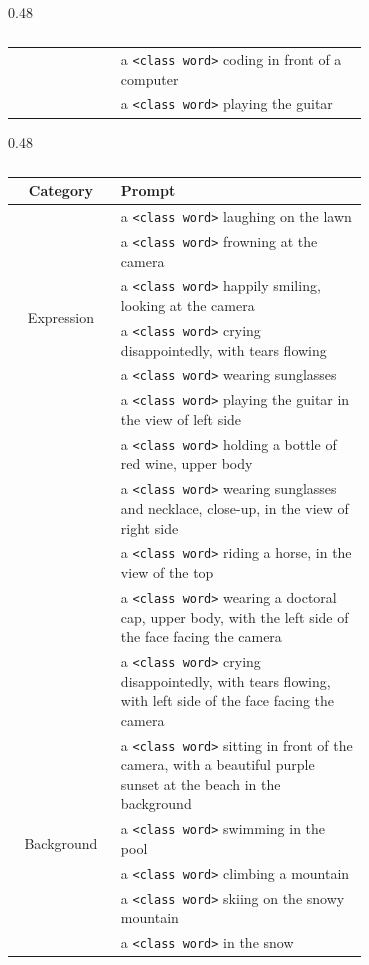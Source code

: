 \begin{table}
\begin{subtable}[h]{0.48\linewidth}
\begin{tabular}{c|p{0.7\linewidth}}
         &  a \texttt{<class word>} coding in front of a computer\\
         &  a \texttt{<class word>} playing the guitar\\
    \bottomrule
    \end{tabular}
    \caption{}
    \end{subtable}
    \begin{subtable}[h]{0.48\linewidth}
    \centering
        \begin{tabular}{c|p{0.7\linewidth}}
        \toprule
            Category  & Prompt \\
        \midrule
         \multirow{6}{*}{Expression}& a \texttt{<class word>} laughing on the lawn\\
         &  a \texttt{<class word>} frowning at the camera\\
         &  a \texttt{<class word>} happily smiling, looking at the camera\\
         &  a \texttt{<class word>} crying disappointedly, with tears flowing\\
         &  a \texttt{<class word>} wearing sunglasses\\
         \hline
          \multirow{14}{*}{View}& a \texttt{<class word>} playing the guitar in the view of left side\\
         &  a \texttt{<class word>} holding a bottle of red wine, upper body\\
         &  a \texttt{<class word>} wearing sunglasses and necklace, close-up, in the view of right side\\
         &  a \texttt{<class word>} riding a horse, in the view of the top\\
         &  a \texttt{<class word>} wearing a doctoral cap, upper body, with the left side of the face facing the camera\\
         &  a \texttt{<class word>} crying disappointedly, with tears flowing, with left side of the face facing the camera\\
         \hline
         \multirow{8}{*}{Background}& a \texttt{<class word>} sitting in front of the camera, with a beautiful purple sunset at the beach in the background\\
         &  a \texttt{<class word>} swimming in the pool\\
         &  a \texttt{<class word>} climbing a mountain\\
         &  a \texttt{<class word>} skiing on the snowy mountain\\
         &  a \texttt{<class word>} in the snow\\

\end{tabular}
\end{subtable}
\end{table}
